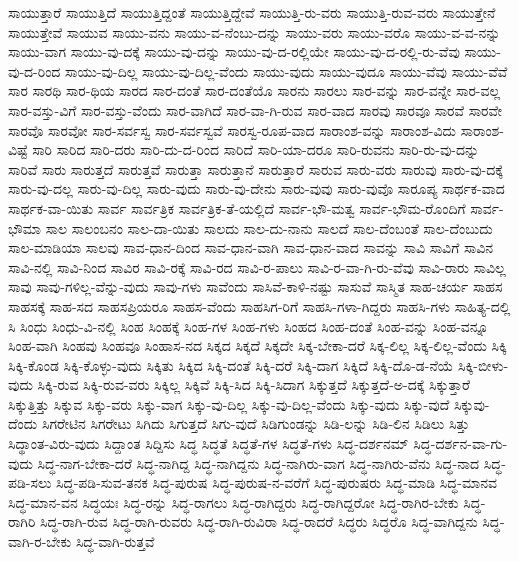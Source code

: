 {ಸಾಯುತ್ತಾರೆ
ಸಾಯುತ್ತಿದೆ
ಸಾಯುತ್ತಿದ್ದಂತೆ
ಸಾಯುತ್ತಿದ್ದೇವೆ
ಸಾಯುತ್ತಿ-ರು-ವರು
ಸಾಯುತ್ತಿ-ರುವ-ವರು
ಸಾಯುತ್ತೇನೆ
ಸಾಯುತ್ತೇವೆ
ಸಾಯುವ
ಸಾಯು-ವನು
ಸಾಯು-ವ-ನೆಂಬು-ದನ್ನು
ಸಾಯು-ವರು
ಸಾಯು-ವರೊ
ಸಾಯು-ವ-ವ-ನನ್ನು
ಸಾಯು-ವಾಗ
ಸಾಯು-ವು-ದಕ್ಕೆ
ಸಾಯು-ವು-ದನ್ನು
ಸಾಯು-ವು-ದ-ರಲ್ಲಿಯೇ
ಸಾಯು-ವು-ದ-ರಲ್ಲಿ-ರು-ವೆವು
ಸಾಯು-ವು-ದ-ರಿಂದ
ಸಾಯು-ವು-ದಿಲ್ಲ
ಸಾಯು-ವು-ದಿಲ್ಲ-ವೆಂದು
ಸಾಯು-ವುದು
ಸಾಯು-ವುದೂ
ಸಾಯು-ವೆವು
ಸಾಯು-ವೆವೆ
ಸಾರ
ಸಾರಥಿ
ಸಾರ-ಥಿಯ
ಸಾರದ
ಸಾರ-ದಂತೆ
ಸಾರ-ದಂತೆಯೊ
ಸಾರನು
ಸಾರಲು
ಸಾರ-ವನ್ನು
ಸಾರ-ವನ್ನೇ
ಸಾರ-ವಲ್ಲ
ಸಾರ-ವಸ್ತು-ವಿಗೆ
ಸಾರ-ವಸ್ತು-ವೆಂದು
ಸಾರ-ವಾಗಿದೆ
ಸಾರ-ವಾ-ಗಿ-ರುವ
ಸಾರ-ವಾದ
ಸಾರವು
ಸಾರವೂ
ಸಾರವೆ
ಸಾರವೇ
ಸಾರವೊ
ಸಾರವೋ
ಸಾರ-ಸರ್ವಸ್ವ
ಸಾರ-ಸರ್ವಸ್ವವೆ
ಸಾರಸ್ವ-ರೂಪ-ವಾದ
ಸಾರಾಂಶ-ವನ್ನು
ಸಾರಾಂಶ-ವಿದು
ಸಾರಾಂಶ-ವಿಷ್ಟೆ
ಸಾರಿ
ಸಾರಿದ
ಸಾರಿ-ದರು
ಸಾರಿ-ದು-ದ-ರಿಂದ
ಸಾರಿದೆ
ಸಾರಿ-ಯಾ-ದರೂ
ಸಾರಿ-ರುವನು
ಸಾರಿ-ರು-ವು-ದನ್ನು
ಸಾರಿವೆ
ಸಾರು
ಸಾರುತ್ತದೆ
ಸಾರುತ್ತವೆ
ಸಾರುತ್ತಾ
ಸಾರುತ್ತಾನೆ
ಸಾರುತ್ತಾರೆ
ಸಾರುವ
ಸಾರು-ವರು
ಸಾರುವು
ಸಾರು-ವು-ದಕ್ಕೆ
ಸಾರು-ವು-ದಲ್ಲ
ಸಾರು-ವು-ದಿಲ್ಲ
ಸಾರು-ವುದು
ಸಾರು-ವು-ದೇನು
ಸಾರು-ವುವು
ಸಾರು-ವುವೊ
ಸಾರೂಪ್ಯ
ಸಾರ್ಥಕ-ವಾದ
ಸಾರ್ಥಕ-ವಾ-ಯಿತು
ಸಾರ್ವ
ಸಾರ್ವತ್ರಿಕ
ಸಾರ್ವತ್ರಿಕ-ತೆ-ಯಲ್ಲಿದೆ
ಸಾರ್ವ-ಭೌ-ಮತ್ವ
ಸಾರ್ವ-ಭೌಮ-ರೊಂದಿಗೆ
ಸಾರ್ವ-ಭೌಮಾ
ಸಾಲ
ಸಾಲಂಬನಂ
ಸಾಲ-ದಾ-ಯಿತು
ಸಾಲದು
ಸಾಲ-ದು-ನಾನು
ಸಾಲದೆ
ಸಾಲ-ದೆಂಬಂತೆ
ಸಾಲ-ದೆಂಬುದು
ಸಾಲ-ಮಾಡಿಯಾ
ಸಾಲವು
ಸಾವ-ಧಾನ-ದಿಂದ
ಸಾವ-ಧಾನ-ವಾಗಿ
ಸಾವ-ಧಾನ-ವಾದ
ಸಾವನ್ನು
ಸಾವಿ
ಸಾವಿಗೆ
ಸಾವಿನ
ಸಾವಿ-ನಲ್ಲಿ
ಸಾವಿ-ನಿಂದ
ಸಾವಿರ
ಸಾವಿ-ರಕ್ಕೆ
ಸಾವಿ-ರದ
ಸಾವಿ-ರ-ಪಾಲು
ಸಾವಿ-ರ-ವಾ-ಗಿ-ರು-ವೆವು
ಸಾವಿ-ರಾರು
ಸಾವಿಲ್ಲ
ಸಾವು
ಸಾವು-ಗಳಿಲ್ಲ-ವೆನ್ನು-ವುದು
ಸಾವು-ಗಳು
ಸಾವೆಂದು
ಸಾಸಿವೆ-ಕಾಳಿ-ನಷ್ಟು
ಸಾಸುವೆ
ಸಾಸ್ಮಿತ
ಸಾಹ-ಚರ್ಯ
ಸಾಹಸ
ಸಾಹಸಕ್ಕೆ
ಸಾಹ-ಸದ
ಸಾಹಸಪ್ರಿಯರೂ
ಸಾಹಸ-ವೆಂದು
ಸಾಹಸಿಗ-ರಿಗೆ
ಸಾಹಸಿ-ಗಳಾ-ಗಿದ್ದರು
ಸಾಹಸಿ-ಗಳು
ಸಾಹಿತ್ಯ-ದಲ್ಲಿ
ಸಿ
ಸಿಂಧು
ಸಿಂಧು-ವಿ-ನಲ್ಲಿ
ಸಿಂಹ
ಸಿಂಹಕ್ಕೆ
ಸಿಂಹ-ಗಳ
ಸಿಂಹ-ಗಳು
ಸಿಂಹದ
ಸಿಂಹ-ದಂತೆ
ಸಿಂಹ-ವನ್ನು
ಸಿಂಹ-ವನ್ನೂ
ಸಿಂಹ-ವಾಗಿ
ಸಿಂಹವು
ಸಿಂಹವೂ
ಸಿಂಹಾಸ-ನದ
ಸಿಕ್ಕದ
ಸಿಕ್ಕದೆ
ಸಿಕ್ಕದೇ
ಸಿಕ್ಕ-ಬೇಕಾ-ದರೆ
ಸಿಕ್ಕ-ಲಿಲ್ಲ
ಸಿಕ್ಕ-ಲಿಲ್ಲ-ವೆಂದು
ಸಿಕ್ಕಿ
ಸಿಕ್ಕಿ-ಕೊಂಡ
ಸಿಕ್ಕಿ-ಕೊಳ್ಳು-ವುದು
ಸಿಕ್ಕಿತು
ಸಿಕ್ಕಿದ
ಸಿಕ್ಕಿ-ದಂತೆ
ಸಿಕ್ಕಿ-ದರೆ
ಸಿಕ್ಕಿ-ದಾಗ
ಸಿಕ್ಕಿದೆ
ಸಿಕ್ಕಿ-ದೊ-ಡ-ನೆಯೆ
ಸಿಕ್ಕಿ-ಬೀಳು-ವುದು
ಸಿಕ್ಕಿ-ರುವ
ಸಿಕ್ಕಿ-ರುವ-ವರು
ಸಿಕ್ಕಿಲ್ಲ
ಸಿಕ್ಕಿವೆ
ಸಿಕ್ಕಿ-ಸಿದ
ಸಿಕ್ಕಿ-ಸಿದಾಗ
ಸಿಕ್ಕುತ್ತದೆ
ಸಿಕ್ಕುತ್ತದೆ-ಅ-ದಕ್ಕೆ
ಸಿಕ್ಕುತ್ತಾರೆ
ಸಿಕ್ಕುತ್ತಿತ್ತು
ಸಿಕ್ಕುವ
ಸಿಕ್ಕು-ವರು
ಸಿಕ್ಕು-ವಾಗ
ಸಿಕ್ಕು-ವು-ದಿಲ್ಲ
ಸಿಕ್ಕು-ವು-ದಿಲ್ಲ-ವೆಂದು
ಸಿಕ್ಕು-ವುದು
ಸಿಕ್ಕು-ವುದೆ
ಸಿಕ್ಕುವು-ದೆಂದು
ಸಿಗರೇಟಿನ
ಸಿಗರೇಟು
ಸಿಗಿದು
ಸಿಗುತ್ತದೆ
ಸಿಗು-ವುದೆ
ಸಿಡಿಗುಂಡನ್ನು
ಸಿಡಿ-ಲನ್ನು
ಸಿಡಿ-ಲಿನ
ಸಿಡಿಲು
ಸಿತ್ತು
ಸಿದ್ಥಾಂತ-ವಿರು-ವುದು
ಸಿದ್ದಾಂತ
ಸಿದ್ದಿಸು
ಸಿದ್ಧ
ಸಿದ್ಧತೆ
ಸಿದ್ಧತೆ-ಗಳ
ಸಿದ್ಧತೆ-ಗಳು
ಸಿದ್ಧ-ದರ್ಶನಮ್
ಸಿದ್ಧ-ದರ್ಶನ-ವಾ-ಗು-ವುದು
ಸಿದ್ಧ-ನಾಗ-ಬೇಕಾ-ದರೆ
ಸಿದ್ಧ-ನಾಗಿದ್ದ
ಸಿದ್ಧ-ನಾಗಿದ್ದನು
ಸಿದ್ಧ-ನಾಗಿರು-ವಾಗ
ಸಿದ್ಧ-ನಾಗಿರು-ವೆನು
ಸಿದ್ಧ-ನಾದ
ಸಿದ್ಧ-ಪಡಿ-ಸಲು
ಸಿದ್ಧ-ಪಡಿ-ಸುವ-ತನಕ
ಸಿದ್ಧ-ಪುರುಷ
ಸಿದ್ಧ-ಪುರುಷ-ನ-ವರೆಗೆ
ಸಿದ್ಧ-ಪುರುಷರು
ಸಿದ್ಧ-ಮಾಡಿ
ಸಿದ್ಧ-ಮಾನವ
ಸಿದ್ಧ-ಮಾನ-ವನ
ಸಿದ್ಧಯಃ
ಸಿದ್ಧ-ರನ್ನು
ಸಿದ್ಧ-ರಾಗಲು
ಸಿದ್ಧ-ರಾಗಿದ್ದರು
ಸಿದ್ಧ-ರಾಗಿದ್ದರೋ
ಸಿದ್ಧ-ರಾಗಿರ-ಬೇಕು
ಸಿದ್ಧ-ರಾಗಿರಿ
ಸಿದ್ಧ-ರಾಗಿ-ರುವ
ಸಿದ್ಧ-ರಾಗಿ-ರುವರು
ಸಿದ್ಧ-ರಾಗಿ-ರುವಿರಾ
ಸಿದ್ಧ-ರಾದರೆ
ಸಿದ್ಧರು
ಸಿದ್ಧರೊ
ಸಿದ್ಧ-ವಾಗಿದ್ದನು
ಸಿದ್ಧ-ವಾಗಿ-ರ-ಬೇಕು
ಸಿದ್ಧ-ವಾಗಿ-ರುತ್ತವೆ
}
